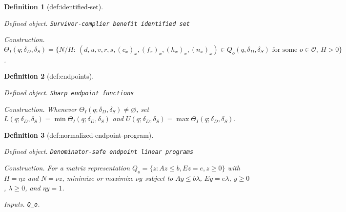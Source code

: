 \documentclass{article}
\newtheorem{definition}{Definition}
\begin{document}
\begin{definition}[def:identified-set]\label{def:identified-set}
\par\smallskip\noindent\emph{Defined object.} \texttt{Survivor-\allowbreak{}complier benefit identified set}
\par\smallskip\noindent\emph{Construction.} \(\Theta_I(q;\delta_D,\delta_S)=\{N/H:\ (d,u,v,r,s,(c_x)_x,(f_x)_x,(h_x)_x,(n_x)_x)\in Q_o(q,\delta_D,\delta_S)\text{ for some }o\in\mathcal O,\ H>0\}\).
\end{definition}

\begin{definition}[def:endpoints]\label{def:endpoints}
\par\smallskip\noindent\emph{Defined object.} \texttt{Sharp endpoint functions}
\par\smallskip\noindent\emph{Construction.} Whenever \(\Theta_I(q;\delta_D,\delta_S)\ne\varnothing\), set \(L(q;\delta_D,\delta_S)=\min\Theta_I(q;\delta_D,\delta_S)\) and \(U(q;\delta_D,\delta_S)=\max\Theta_I(q;\delta_D,\delta_S)\).
\end{definition}

\begin{definition}[def:normalized-endpoint-program]\label{def:normalized-endpoint-program}
\par\smallskip\noindent\emph{Defined object.} \texttt{Denominator-\allowbreak{}safe endpoint linear programs}
\par\smallskip\noindent\emph{Construction.} For a matrix representation \(Q_o=\{z:Az\le b,Ez=e,z\ge0\}\) with \(H=\eta z\) and \(N=\nu z\), minimize or maximize \(\nu y\) subject to \(Ay\le b\lambda\), \(Ey=e\lambda\), \(y\ge0\), \(\lambda\ge0\), and \(\eta y=1\).
\par\smallskip\noindent\emph{Inputs.} \texttt{Q\_\allowbreak{}o}.
\end{definition}
\end{document}
